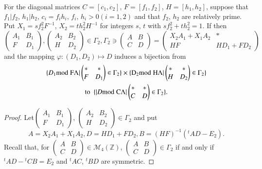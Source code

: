 \begin{sublemma}\label{c1:lem-1.5.16}
For the diagonal matrices $C=[c_{1},c_{2}]$, $F=[f_{1},f_{2}]$,
$H=[h_{1},h_{2}]$, suppose that $f_{1}|f_{2}$, $h_{1}|h_{2}$,
$c_{i}=f_{i}h_{i}$, $f_{i}$, $h_{i}>0(i=1,2)$ and that $f_{2}$,
$h_{2}$ are relatively prime. Put $X_{1}=sf^{2}_{2}F^{-1}$,
$X_{2}=th^{2}_{2}H^{-1}$ for integers $s$, $t$ with
$sf^{2}_{2}+th^{2}_{2}=1$. If then
{\fontsize{10}{12}\selectfont
$$
\begin{pmatrix}
A_{1} & B_{1}\\
F & D_{1}
\end{pmatrix},
\begin{pmatrix}
A_{2} & B_{2}\\
H & D_{2}
\end{pmatrix}
\in \Gamma_{2},
\Gamma_{2}\ni 
\begin{pmatrix}
A & B\\
C & D
\end{pmatrix}
=
\begin{pmatrix}
X_{2}A_{1}+X_{1}A_{2} & \ast\\
HF & HD_{1}+FD_{2}
\end{pmatrix}
$$}
and the mapping $\varphi : (D_{1},D_{2})\mapsto D$ induces a bijection
from
\begin{gather*}
 \{D_{1}\rm{mod} \; F\Lambda|
\begin{pmatrix}
\ast & \ast\\
 F & D_{1}
\end{pmatrix}
\in \Gamma_{2}\}\times \{D_{2}\rm{mod} \; H\Lambda|
\begin{pmatrix}
\ast & \ast\\
H & D_{2}
\end{pmatrix}
\in \Gamma_{2}\}\\
 \text{to \ } \{|D\rm{mod} \; C\Lambda|
\begin{pmatrix}
\ast & \ast\\
C & D
\end{pmatrix}
\in\Gamma_{2}\}.
\end{gather*}
\end{sublemma}

\begin{proof}
Let\pageoriginale $\left(\begin{smallmatrix} A_{1} & B_{1}\\ F & D_{1}
\end{smallmatrix}\right)$, $\left(\begin{smallmatrix} A_{2} &
  B_{2}\\ H & D_{2}\end{smallmatrix}\right)\in \Gamma_{2}$ and put 
$$
A=X_{2}A_{1}+X_{1}A_{2}, D=HD_{1}+FD_{2}, B=(HF)^{-1}({}^{t}AD-E_{2}).
$$
Recall that, for $\left(\begin{smallmatrix} A & B\\ C & D
\end{smallmatrix}\right)\in \mathscr{M}_{4}(\mathbb{Z})$,
$\left(\begin{smallmatrix} A & B\\ C & D
\end{smallmatrix}\right)\in\Gamma_{2}$ if and only if
${}^{t}AD-{}^{t}CB=E_{2}$ and ${}^{t}AC$, ${}^{t}BD$ are symmetric.
\end{proof}


